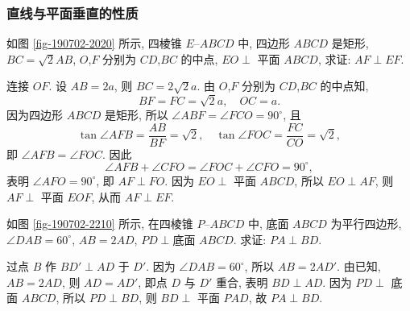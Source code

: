 \subsubsection{直线与平面垂直的性质}
\begin{example}
    如图 \ref{fig-190702-2020} 所示, 四棱锥 $E\text{--}ABCD$ 中, 四边形 $ABCD$ 是矩形, $BC=\sqrt2 AB$, $O$,$F$ 分别为 $CD$,$BC$ 的中点, $EO\perp$ 平面 $ABCD$, 求证: $AF\perp EF$.
\end{example}
\beginsolution
    连接 $OF$. 设 $AB=2a$, 则 $BC= 2\sqrt2 a$. 由 $O$,$F$ 分别为 $CD$,$BC$ 的中点知,
    \[BF= FC= \sqrt2 a,\quad OC= a.\]
    因为四边形 $ABCD$ 是矩形, 
    所以 $\angle ABF= \angle FCO= 90^\circ$, 且
    \[\tan\angle AFB= \frac{AB}{BF}= \sqrt2,\quad
    \tan\angle FOC= \frac{FC}{CO}= \sqrt2,\]
    即 $\angle AFB= \angle FOC$. 因此
    \[\angle AFB+\angle CFO= \angle FOC+\angle CFO= 90^\circ,\]
    表明 $\angle AFO= 90^\circ$, 即 $AF\perp FO$. 因为 $EO\perp$ 平面 $ABCD$, 所以 $EO\perp AF$, 则 $AF\perp$ 平面 $EOF$, 从而 $AF\perp EF$.
\endsolution

\lianxi
\begin{exercise}
    如图 \ref{fig-190702-2210} 所示, 在四棱锥 $P\text{--}ABCD$ 中, 底面 $ABCD$ 为平行四边形, $\angle DAB=60^\circ$, $AB=2AD$, $PD\perp\text{底面\ }ABCD$. 求证: $PA\perp BD$.
\end{exercise}
\beginsolution
    过点 $B$ 作 $BD'\perp AD$ 于 $D'$. 因为 $\angle DAB= 60^\circ$, 所以 $AB= 2AD'$. 由已知, $AB= 2AD$, 则 $AD=AD'$, 即点 $D$ 与 $D'$ 重合, 表明 $BD\perp AD$. 因为 $PD\perp$ 底面 $ABCD$, 所以 $PD\perp BD$, 则 $BD\perp$ 平面 $PAD$, 故 $PA\perp BD$.
\endsolution

